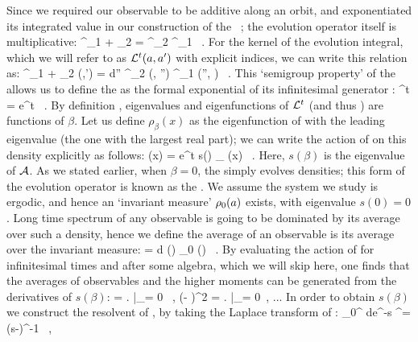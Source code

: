 Since we required our observable to be additive along an orbit, and 
exponentiated its integrated value in our construction of the \evOper\ 
; the evolution operator itself is multiplicative:
\beq
    \Lop^{\zeit_1 + \zeit_2} = \Lop^{\zeit_2} \Lop^{\zeit_1} \, .
    \label{eq-SemiGroup}
\eeq
For the kernel of the evolution integral, which we will refer to as 
${\cal L}^{t} (a, a')$ with explicit indices, we can write this relation 
as:
\beq
	\Lop^{\zeit_1 + \zeit_2} (\ssp,\ssp') = 
    \int d\ssp'' \Lop^{\zeit_2} (\ssp, \ssp'') 
                   \Lop^{\zeit_1} (\ssp'', \ssp) \, .
	\label{eq-SemiGroupKernel}
\eeq
This `semigroup property'  of the {\evOper} allows us to 
define the {\evOper} as the formal exponential of its infinitesimal generator 
\Aop :
\beq
	\Lop^t = e^{\Aop t} \, .
	\label{eq-EvOpExp}
\eeq
By definition , eigenvalues and eigenfunctions of ${\cal L}^t$ (and
thus \Aop ) are functions of $\beta$. Let us define $\rho_{\beta} (x)$ as the
eigenfunction of  with the leading eigenvalue (the one with the
largest real part); we can write the action of \refeq{e-EvOper} on this density
explicitly as follows:
\beq
     (x) = e^{t s(\beta )} \rho_{\beta} (x) \, .
    \label{eq-EigenvalueRel}
\eeq
Here, $s(\beta)$ is the eigenvalue of ${\cal A}$. As we stated earlier, when 
$\beta = 0$, the {\evOper} simply evolves densities; this form of the evolution
operator is known as the {\FPoper}. We assume the system we study is ergodic, 
and hence an `invariant measure' $\rho_0(a)$ exists, with eigenvalue 
$s(0) = 0$. Long time spectrum of any observable is going to be dominated by 
its average over such a density, hence we define the average of an observable
is its average over the invariant measure:
\beq
    \langle \obser \rangle = \int d \ssp \obser(\ssp) \rho_0 (\ssp) \, .
    \label{e-obserAvg}
\eeq
By evaluating the action of {\evOper}  for infinitesimal 
times and after some algebra, which we will skip here, one finds that the 
averages of observables and the higher moments can be generated from the 
derivatives of $s(\beta)$:
\beq
    \langle \obser \rangle = 
        \left.  \right|_{\beta = 0} \, , \quad
    \langle (\obser - \langle \obser \rangle )^2 \rangle = 
        \left.  \right|_{\beta = 0} \,, ...
    \label{eq-moments}
\eeq
In order to obtain $s(\beta)$ we construct the resolvent of \Aop , by taking 
the Laplace transform of \refeq{eq-EvOpExp}:
\beq
	\int_0^{\infty} d\zeit e^{-s\zeit} \Lop^\zeit = (s-\Aop)^{-1} \, ,
